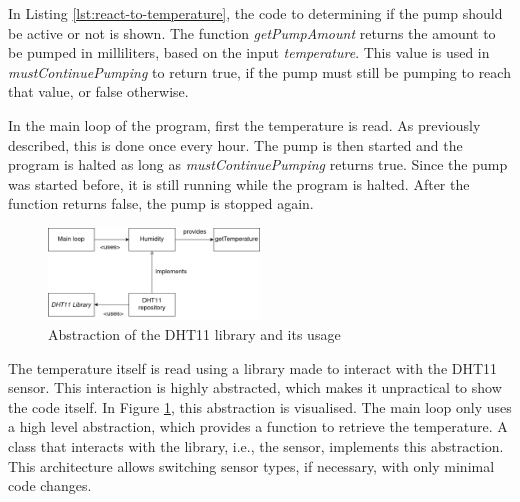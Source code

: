 In Listing \ref{lst:react-to-temperature}, the code to determining if the pump should be active or not is shown.
The function \textit{getPumpAmount} returns the amount to be pumped in milliliters, based on the input \textit{temperature}.
This value is used in \textit{mustContinuePumping} to return true, if the pump must still be pumping to reach that value, or false otherwise.

In the main loop of the program, first the temperature is read.
As previously described, this is done once every hour.
The pump is then started and the program is halted as long as \textit{mustContinuePumping} returns true.
Since the pump was started before, it is still running while the program is halted.
After the function returns false, the pump is stopped again.

\begin{figure}[h]
    \centering
    \includegraphics[width=0.5\textwidth]{img/humidity-architecture}
    \caption{Abstraction of the DHT11 library and its usage}
    \label{fig:abstraction-of-dht11}
\end{figure}

The temperature itself is read using a library made to interact with the DHT11 sensor.
This interaction is highly abstracted, which makes it unpractical to show the code itself.
In Figure \ref{fig:abstraction-of-dht11}, this abstraction is visualised.
The main loop only uses a high level abstraction, which provides a function to retrieve the temperature.
A class that interacts with the library, i.e., the sensor, implements this abstraction.
This architecture allows switching sensor types, if necessary, with only minimal code changes.
